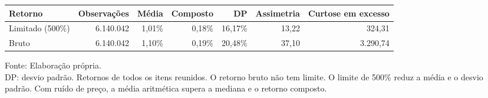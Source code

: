 \begingroup
\setlength{}
\setlength{}
\fontsize{9.5pt}{11.4pt}\selectfont

\setlength{\LTpost}{0mm}
\begin{longtable}{@{\extracolsep{\fill}}lrrrrrr}

\toprule
\textbf{Retorno} & \textbf{Observações} & \textbf{Média} & \textbf{Composto} & \textbf{DP} & \textbf{Assimetria} & \textbf{Curtose em excesso} \\ 
\midrule\addlinespace[2.5pt]
Limitado (500\%) & 6.140.042 & 1,01\% & 0,18\% & 16,17\% & 13,22 & 324,31 \\
Bruto & 6.140.042 & 1,10\% & 0,19\% & 20,48\% & 37,10 & 3.290,74 \\
\bottomrule
\end{longtable}
\begin{minipage}{\linewidth}
Fonte: Elaboração própria.\\
DP: desvio padrão. Retornos de todos os itens reunidos. O retorno bruto não tem limite. O limite de 500\% reduz a média e o desvio padrão. Com ruído de preço, a média aritmética supera a mediana e o retorno composto.\\
\end{minipage}
\endgroup
